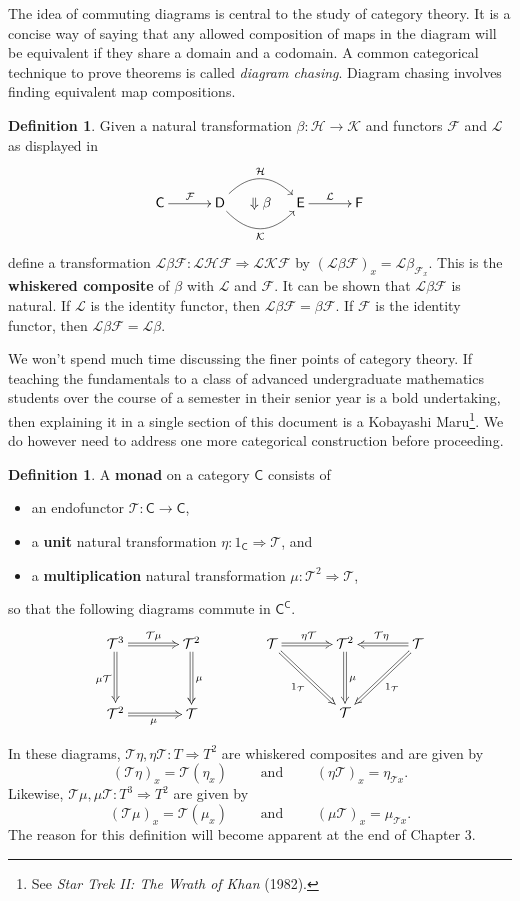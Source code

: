 \documentclass[MS, xcolor=dvipsnames]{wfuthesis}
\def\sC{\mathsf{C}}
\def\sD{\mathsf{D}}
\def\cF{\mathcal{F}}
\def\cT{\mathcal{T}}
\def\and{\text{ and }}
\theoremstyle{definition}
\newtheorem{definition}[theorem]{Definition}
\begin{document}
The idea of commuting diagrams is central to the study of category theory. It is a concise way of saying that any allowed composition of maps in the diagram will be equivalent if they share a domain and a codomain. A common categorical technique to prove theorems is called \emph{diagram chasing}. Diagram chasing involves finding equivalent map compositions. \par
\begin{definition}
  Given a natural transformation $\beta: \mathcal H \to \mathcal K$ and functors $\mathcal F$ and $\mathcal L$ as displayed in
  \[ \SelectTips{cm}{}\xymatrix@C-1pc{
    \sC \ar[0,2]^{\cF} & & \sD \ar@/^1.5pc/[0,2]^{\mathcal H} \ar@/_1.5pc/[0,2]_{\mathcal K} & \Downarrow\beta & \mathsf E \ar[0,2]^{\mathcal L} & & \mathsf F
  } \]
  define a transformation $\mathcal L \beta \mathcal F: \mathcal L \mathcal H \mathcal F \Rightarrow \mathcal L \mathcal K \mathcal F$ by $(\mathcal L \beta \mathcal F)_x = \mathcal L \beta_{\mathcal F_x}$. This is the \textbf{whiskered composite} of $\beta$ with $\mathcal L$ and $\mathcal F$. It can be shown that $\mathcal L \beta \mathcal F$ is natural. If $\mathcal L$ is the identity functor, then $\mathcal L \beta \mathcal F = \beta \mathcal F$. If $\mathcal F$ is the identity functor, then  $\mathcal L \beta \mathcal F = \mathcal L \beta$.
\end{definition}
We won't spend much time discussing the finer points of category theory. If teaching the fundamentals to a class of advanced undergraduate mathematics students over the course of a semester in their senior year is a bold undertaking, then explaining it in a single section of this document is a Kobayashi Maru\footnote{See \textit{Star Trek II: The Wrath of Khan} (1982).}. We do however need to address one more categorical construction before proceeding.
\begin{definition}
  A \textbf{monad} on a category $\sC$ consists of
  \begin{itemize}
    \item an endofunctor $\cT: \sC \to \sC$,
    \item a \textbf{unit} natural transformation $\eta: 1_\sC \Rightarrow \cT$, and
    \item a \textbf{multiplication} natural transformation $\mu: \cT^2 \Rightarrow \cT$,
  \end{itemize}
  so that the following diagrams commute in $\sC^\sC$.
  \[ \SelectTips{cm}{}\xymatrix@R+1pc@C+1pc{
  \cT^3 \ar@{=>}[r]^{\cT\mu} \ar@{=>}[d]_{\mu \cT} & \cT^2 \ar@{=>}[d]^\mu \\ \cT^2 \ar@{=>}[r]_\mu & \cT
  } \qquad\qquad \SelectTips{cm}{}\xymatrix@R+1pc@C+1pc{
  \cT \ar@{=>}[r]^{\eta \cT} \ar@{=>}[dr]_{1_\cT} & \cT^2 \ar@{=>}[d]^\mu & \cT \ar@{=>}[l]_{\cT\eta} \ar@{=>}[dl]^{1_\cT} \\ & \cT &
  } \]
\end{definition}
In these diagrams, $\cT\eta,\eta\cT: T \Rightarrow T^2$ are whiskered composites and are given by
\[ (\cT\eta)_x = \cT(\eta_x) \qquad\and\qquad (\eta\cT)_x = \eta_{\cT x}. \]
Likewise, $\cT\mu,\mu\cT: T^3 \Rightarrow T^2$ are given by
\[ (\cT\mu)_x = \cT(\mu_x) \qquad\and\qquad (\mu\cT)_x = \mu_{\cT x}. \]
The reason for this definition will become apparent at the end of Chapter 3.
\end{document}
